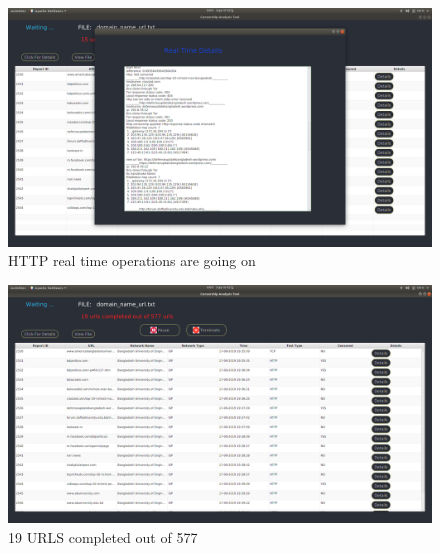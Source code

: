\begin{figure}[h]
    \centering
    \includegraphics[width=\textwidth]{usersite/35realtimedetails.png}
    \caption{HTTP real time operations are going on}
    \label{fig:user35}
\end{figure}

\begin{figure}[h]
    \centering
    \includegraphics[width=\textwidth]{usersite/36completing.png}
    \caption{19 URLS completed out of 577}
    \label{fig:user36}
\end{figure}
